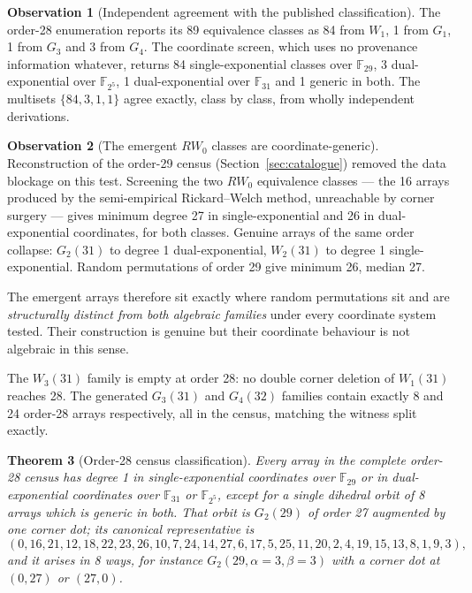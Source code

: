 \documentclass[11pt,a4paper]{article}
\newtheorem{theorem}{Theorem}[section]
\theoremstyle{definition}
\newtheorem{observation}[theorem]{Observation}
\newcommand{\F}{\mathbb{F}}
\begin{document}
\begin{observation}[Independent agreement with the published classification]
The order-28 enumeration reports its 89 equivalence classes as 84 from $W_1$, 1
from $G_1$, 1 from $G_3$ and 3 from $G_4$. The coordinate screen, which uses no
provenance information whatever, returns 84 single-exponential classes over
$\F_{29}$, 3 dual-exponential over $\F_{2^5}$, 1 dual-exponential over $\F_{31}$
and 1 generic in both. The multisets $\{84,3,1,1\}$ agree exactly, class by
class, from wholly independent derivations.
\end{observation}

\begin{observation}[The emergent $RW_0$ classes are coordinate-generic]
\label{obs:rw0}
Reconstruction of the order-29 census (Section~\ref{sec:catalogue}) removed the
data blockage on this test. Screening the two $RW_0$ equivalence classes --- the
16 arrays produced by the semi-empirical Rickard--Welch method, unreachable by
corner surgery --- gives minimum degree 27 in single-exponential and 26 in
dual-exponential coordinates, for both classes. Genuine arrays of the same order
collapse: $G_2(31)$ to degree 1 dual-exponential, $W_2(31)$ to degree 1
single-exponential. Random permutations of order 29 give minimum 26, median 27.

The emergent arrays therefore sit exactly where random permutations sit and are
\emph{structurally distinct from both algebraic families} under every coordinate
system tested. Their construction is genuine but their coordinate behaviour is
not algebraic in this sense.
\end{observation}

The $W_3(31)$ family is empty at order 28: no double corner deletion of
$W_1(31)$ reaches 28. The generated $G_3(31)$ and $G_4(32)$ families contain
exactly 8 and 24 order-28 arrays respectively, all in the census, matching the
witness split exactly.

\begin{theorem}[Order-28 census classification]
\label{thm:census28}
Every array in the complete order-28 census has degree 1 in single-exponential
coordinates over $\F_{29}$ or in dual-exponential coordinates over $\F_{31}$ or
$\F_{2^5}$, except for a single dihedral orbit of 8 arrays which is generic in
both. That orbit is $G_2(29)$ of order 27 augmented by one corner dot; its
canonical representative is
\[
(0,16,21,12,18,22,23,26,10,7,24,14,27,6,17,5,25,11,20,2,4,19,15,13,8,1,9,3),
\]
and it arises in 8 ways, for instance $G_2(29,\alpha{=}3,\beta{=}3)$ with a corner
dot at $(0,27)$ or $(27,0)$.
\end{theorem}
\end{document}
